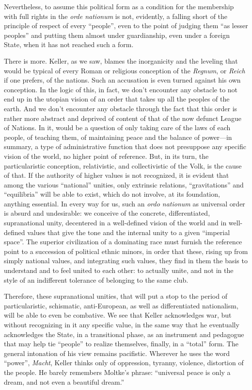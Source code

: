 Nevertheless, to assume this political form as a condition for the membership with full rights in the \emph{orde nationum} is not, evidently, a falling short of the principle of respect of every ``people'', even to the point of judging them ``as lesser peoples'' and putting them almost under guardianship, even under a foreign State, when it has not reached such a form.

There is more. Keller, as we saw, blames the inorganicity and the leveling that would be typical of every Roman or religious conception of the \emph{Regnum}, or \emph{Reich} if one prefers, of the nations. Such an accusation is even turned against his own conception. In the logic of this, in fact, we don't encounter any obstacle to not end up in the utopian vision of an order that takes up all the peoples of the earth. And we don't encounter any obstacle through the fact that this order is rather more abstract and deprived of content of that of the now defunct League of Nations. In it, would be a question of only taking care of the laws of each people, of teaching them, of maintaining peace and the balance of power---in summary, a type of administrative function that does not presuppose any specific vision of the world, no higher point of reference. But, in its turn, the particularistic conception, relativistic, and collectivistic of the Volk, is the cause of that. If the authority of higher values is not recognized, it is evident that among the various ``national'' unities, only extrinsic relations, ``gravitations'' and ``equilibria'' will be able to exist, which do not involve, at its foundation, anything essential. In every way for us, such an \emph{ordo nationum} as universal order is absurd and undesirable: we conceive of the concrete, differentiated, supranational unity, decentered in a well-defined vision of the world and in well-defined values that give the tone and the internal unity to a given ``imperial space''. The superior civilization of a dominating race must furnish the reference point to a succession of political ethnic minors, in order that these, rising up from simply national values, and integrating such values, they find in them the basis to understand and to feel united to each other: to actually unite, and not in the style of an indifferent tolerance of belonging to the same club.

Therefore, these supranational unities, that will put a stop to the period of particularistic, schismatic, anti-European, as well as differentiated nationalism, will be able to even be combative. We see that Keller acknowledges war, but without recognizing in it any specific value, in the same way that he eventually acknowledges the State, in a transitional phase, as an instrument and pedagogue that may help tie ``people'' to realize themselves, finally, in a ``total'' form. The general intonation of his view remains pacifistic. Wherever he uses the word ``power'', \emph{Macht}, Keller thinks only of oppression, tyranny, violence, distortion of the people. He barely remembers Moltke's phrase: ``universal peace is only a dream, and not even a beautiful dream.''

